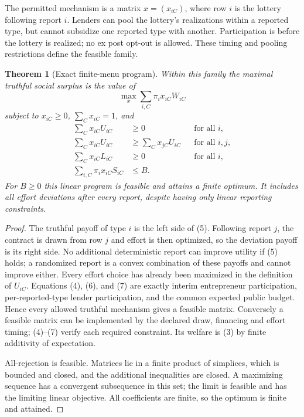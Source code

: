 \documentclass[11pt]{article}
\newtheorem{theorem}{Theorem}
\theoremstyle{remark}
\begin{document}
The permitted mechanism is a matrix $x=(x_{iC})$, where row $i$ is the
lottery following report $i$. Lenders can pool the lottery's realizations
within a reported type, but cannot subsidize one reported type with another.
Participation is before the lottery is realized; no ex post opt-out is
allowed. These timing and pooling restrictions define the feasible family.

\begin{theorem}[Exact finite-menu program]
Within this family the maximal truthful social surplus is the value of
\[
 \max_x \sum_{i,C}\pi_i x_{iC}W_{iC} \tag{3}
\]
subject to $x_{iC}\geq0$, $\sum_Cx_{iC}=1$, and
\begin{align}
 \sum_Cx_{iC}U_{iC}&\geq0 &&\text{for all }i,\tag{4}\\
 \sum_Cx_{iC}U_{iC}&\geq\sum_Cx_{jC}U_{iC}
                         &&\text{for all }i,j,\tag{5}\\
 \sum_Cx_{iC}L_{iC}&\geq0 &&\text{for all }i,\tag{6}\\
 \sum_{i,C}\pi_i x_{iC}S_{iC}&\leq B. &&\tag{7}
\end{align}
For $B\geq0$ this linear program is feasible and attains a finite optimum.
It includes all effort deviations after every report, despite having only
linear reporting constraints.
\end{theorem}
\begin{proof}
The truthful payoff of type $i$ is the left side of (5). Following report
$j$, the contract is drawn from row $j$ and effort is then optimized,
so the deviation payoff is its right side. No additional deterministic
report can improve utility if (5) holds; a randomized report is a convex
combination of these payoffs and cannot improve either. Every effort
choice has already been maximized in the definition of $U_{iC}$.
Equations (4), (6), and (7) are exactly interim entrepreneur participation,
per-reported-type lender participation, and the common expected public
budget. Hence every allowed truthful mechanism gives a feasible matrix.
Conversely a feasible matrix can be implemented by the declared draw,
financing and effort timing; (4)--(7) verify each required constraint.
Its welfare is (3) by finite additivity of expectation.

All-rejection is feasible. Matrices lie in a finite product of simplices,
which is bounded and closed, and the additional inequalities are closed.
A maximizing sequence has a convergent subsequence in this set; the limit
is feasible and has the limiting linear objective. All coefficients are
finite, so the optimum is finite and attained.
\end{proof}
\end{document}
